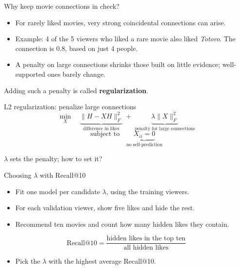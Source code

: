 \documentclass[aspectratio=169]{beamer}
\begin{document}
\begin{frame}{Why keep movie connections in check?}
  \begin{itemize}
    \item For rarely liked movies, very strong coincidental connections can arise.
    \item Example: 4 of the 5 viewers who liked a rare movie also liked
      \emph{Totoro}. The connection is 0.8, based on just 4 people.
    \item A penalty on large connections shrinks those built on little evidence;
      well-supported ones barely change.
  \end{itemize}

  \vspace{1em}
  \begin{center}
    Adding such a penalty is called \textbf{regularization}.
  \end{center}
\end{frame}

\begin{frame}{L2 regularization: penalize large connections}
  \[
    \min_X \quad \underbrace{\|H - XH\|_F^2}_{\text{difference in likes}}
    \; + \; \underbrace{\lambda\|X\|_F^2}_{\text{penalty for large connections}}
  \]
  \[
    \text{subject to} \quad \underbrace{X_{ii} = 0}_{\text{no self-prediction}}
  \]

  \vspace{1em}
  \begin{center}
    $\lambda$ sets the penalty; how to set it?
  \end{center}
\end{frame}

\begin{frame}{Choosing $\lambda$ with Recall@10}
  \begin{itemize}
    \item Fit one model per candidate $\lambda$, using the training viewers.
    \item For each validation viewer, show five likes and hide the rest.
    \item Recommend ten movies and count how many hidden likes they contain.
  \end{itemize}

  \[
    \mathrm{Recall@10} =
    \frac{\text{hidden likes in the top ten}}{\text{all hidden likes}}
  \]

  \begin{itemize}
    \item Pick the $\lambda$ with the highest average Recall@10.
  \end{itemize}
\end{frame}
\end{document}
